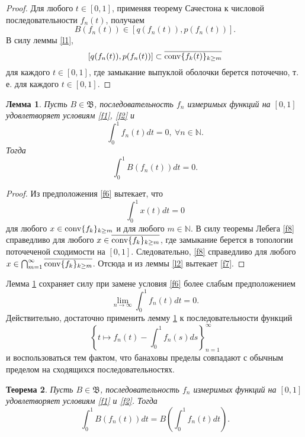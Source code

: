 \documentclass[12pt]{article}
\newtheorem{thm}{Теорема}
\newtheorem{lem}[thm]{Лемма}
\def\N{{\mathbb{N}}}
\def\B{{\mathfrak{B}}}
\begin{document}
\begin{proof}
Для любого $t\in[0,1]$, применяя теорему Сачестона \cite{S} к числовой последовательности $f_n(t)$, получаем
\begin{equation}\label{f4}
B(f_n(t)) \in \left[ q(f_n(t)), p(f_n(t)) \right].
 \end{equation}
 В силу леммы \ref{l1},
 \begin{equation}\label{f5}
\left[ q(f_n(t)), p(f_n(t)) \right]\subset \overline{{\rm conv} \{f_k(t)\}_{k\ge m}}
 \end{equation}
 для каждого $t\in[0,1]$, где замыкание выпуклой оболочки берется поточечно, т. е. для каждого $t\in[0,1]$.
\end{proof}


\begin{lem}\label{l3}
Пусть $B\in \B$, последовательность $f_n$  измеримых функций на $[0,1]$  удовлетворяет условиям \eqref{f1}, \eqref{f2} и
\begin{equation}\label{f6}
\int_0^1 f_n(t) dt=0, \ \forall n\in \N.
\end{equation}
Тогда
\begin{equation}\label{f7}
\int_0^1 B(f_n(t)) dt=0.
\end{equation}
\end{lem}

 \begin{proof}
 Из предположения \eqref{f6} вытекает, что
 \begin{equation}\label{f8}
\int_0^1 x(t) dt=0
\end{equation}
для любого $x\in {\rm conv} \{f_k\}_{k\ge m}$ и для любого $m\in \N.$ В силу теоремы Лебега \eqref{f8} справедливо для любого $x\in \overline{{\rm conv} \{f_k\}_{k\ge m}}$, где замыкание берется в топологии поточеченой сходимости на $[0,1]$. Следовательно, \eqref{f8} справедливо для любого $x\in \bigcap_{m=1}^\infty\overline{{\rm conv} \{f_k\}_{k\ge m}}$. Отсюда и из леммы \ref{l2} вытекает \eqref{f7}.
 \end{proof}

Лемма \ref{l3} сохраняет силу при замене условия \eqref{f6} более слабым предположением
$$ \lim_{n\to\infty} \int_0^1 f_n(t) dt=0.$$
Действительно, достаточно применить лемму \ref{l3} к последовательности функций
$$\left\{ t\mapsto f_n(t)-\int_0^1 f_n(s) ds\right\}_{n=1}^\infty$$
и воспользоваться тем фактом, что банаховы пределы совпадают с обычным пределом на сходящихся последовательностях.

 \begin{thm}\label{t1}
Пусть $B\in \B$, последовательность $f_n$  измеримых функций на $[0,1]$  удовлетворяет условиям \eqref{f1} и  \eqref{f2}.
Тогда
\begin{equation*}
\int_0^1 B(f_n(t)) dt = B\left(\int_0^1 f_n(t) dt\right).
 \end{equation*}
\end{thm}
\end{document}
